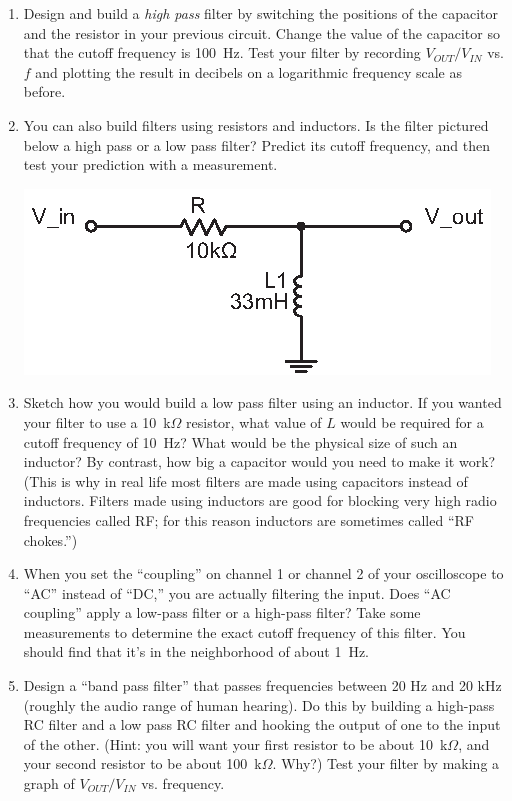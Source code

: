 \begin{enumerate}[wide]
\item Design and build a \textit{high pass} filter by switching the positions of the capacitor and the resistor in your previous circuit.  Change the value of the capacitor so that the cutoff frequency is 100~Hz.  Test your filter by recording $V_{OUT}/V_{IN}$ vs. $f$ and plotting the result in decibels on a logarithmic frequency scale as before.  

\item You can also build filters using resistors and inductors.  Is the filter pictured below a high pass or a low pass filter?  Predict its cutoff frequency, and then test your prediction with a measurement.
\begin{center}
\includegraphics{filters/high_pass_filter_LR.eps}
\end{center}

\item Sketch how you would build a low pass filter using an inductor.  If you wanted your filter to use a 10~k$\Omega$ resistor, what value of $L$ would be required for a cutoff frequency of 10~Hz?  What would be the physical size of such an inductor?  By contrast, how big a capacitor would you need to make it work?  (This is why in real life most filters are made using capacitors instead of inductors.  Filters made using inductors are good for blocking very high radio frequencies called RF; for this reason inductors are sometimes called ``RF chokes.'')  

\item When you set the ``coupling'' on channel 1 or channel 2 of your oscilloscope to ``AC'' instead of ``DC,'' you are actually filtering the input.  Does ``AC coupling'' apply a low-pass filter or a high-pass filter?  Take some measurements to determine the exact cutoff frequency of this filter.  You should find that it's in the neighborhood of about 1~Hz.

\item Design a ``band pass filter'' that passes frequencies between 20 Hz and 20 kHz (roughly the audio range of human hearing).  Do this by building a high-pass RC filter and a low pass RC filter and hooking the output of one to the input of the other.  (Hint: you will want your first resistor to be about 10~k$\Omega$, and your second resistor to be about 100~k$\Omega$.  Why?)   Test your filter by making a graph of $V_{OUT}/V_{IN}$ vs. frequency.


\end{enumerate}
